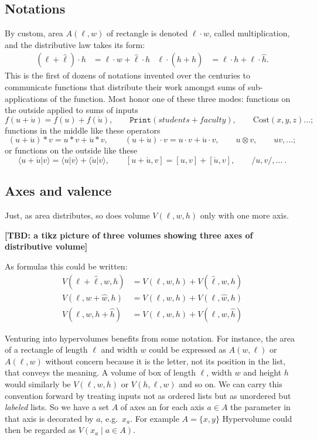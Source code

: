 \subsection{Notations}

By custom, area $A(\ell,w)$ of rectangle is denoted $\ell \cdot w$, called
multiplication, and the distributive law takes its form:
\begin{align*}
    (\ell+\hat{\ell})\cdot h & = \ell \cdot w +\hat{\ell}\cdot h 
    &
    \ell \cdot (h+\hat{h}) & = \ell\cdot h +\ell\cdot \hat{h}.
\end{align*}
This is the first of dozens of notations invented over the centuries to communicate 
functions that distribute their work amongst sums of sub-applications of the function.  
Most honor one of these three modes:
functions on the outside applied to sums of inputs 
\[ 
    f(u+\acute{u})=f(u)+f(\acute{u}),\qquad 
    \texttt{Print}(students+faculty),\qquad
    \text{Cost}
    (x,y,z)\ldots;
\]
functions in the middle like these operators 
\[
    (u+\acute{u})*v=u*v+\acute{u}*v, \qquad 
    (u+\acute{u})\cdot v=u\cdot v+\acute{u}\cdot v,\qquad 
    u\otimes v, \qquad 
    uv,\ldots; 
\]
or functions on the outside like these
\[
    \langle u+\acute{u}|v\rangle=\langle u|v\rangle +\langle \acute{u}|v\rangle,\qquad 
    [u+\acute{u},v]=[u,v]+[\acute{u},v],\qquad  
    /u,v/,\ldots~.
\]
   
\subsection{Axes and valence}
Just, as area distributes, so does volume $V(\ell,w,h)$ only with one more axis.
\begin{center}
    \textbf{[TBD: a tikz picture of three volumes showing three axes of distributive volume]}
\end{center}
As formulas this could be written:
\begin{align*}
    V(\ell+\hat{\ell},w,h) & = V(\ell,w,h)+V(\hat{\ell},w,h)\\
        V(\ell,w+\hat{w},h) & = V(\ell,w,h)+V(\ell,\hat{w},h)\\
        V(\ell,w,h+\hat{h}) & = V(\ell,w,h)+V(\ell,w,\hat{h})
\end{align*}

Venturing into hypervolumes benefits from some notation.  For instance, the area
of a rectangle of length $\ell$ and width $w$ could be expressed  as $A(w,\ell)$
or $A(\ell,w)$ without concern because it is the letter, not its position in the
list, that conveys the meaning.  A volume of box of length $\ell$, width $w$ and
height $h$ would similarly be $V(\ell,w,h)$ or $V(h,\ell,w)$ and so on.  
We can carry this convention forward by treating inputs not as ordered lists but 
as unordered but \emph{labeled} lists.  So we have a set $A$ of axes an for each 
axis $a\in A$ the parameter in that axis is decorated by $a$, e.g.\ $x_a$.
For example $A=\{x,y\}$
Hypervolume could then be regarded as $V(x_a\mid a\in A)$.

